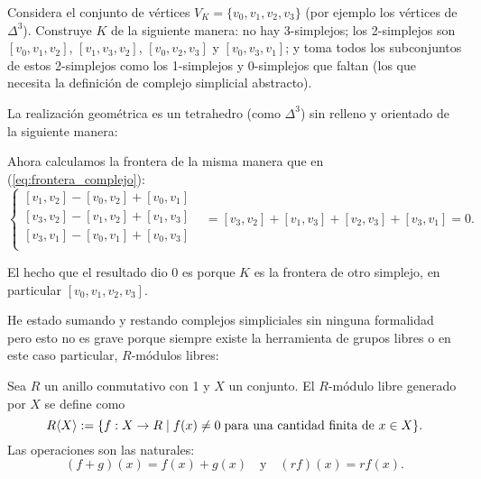 \documentclass[../../topologia_algebraica]{subfiles}
\begin{document}
\begin{ejemplo}
  Considera el conjunto de v\'ertices $V_K=\{v_0,v_1,v_2,v_3\}$ (por ejemplo los v\'ertices de $\Delta^3$).
  Construye $K$ de la siguiente manera: no hay 3-simplejos; los 2-simplejos son $[v_0,v_1,v_2]$, $[v_1,v_3,v_2]$,
  $[v_0,v_2,v_3]$ y $[v_0,v_3,v_1]$; y toma todos los subconjuntos de estos 2-simplejos como los
  1-simplejos y 0-simplejos que faltan (los que necesita la definici\'on de complejo simplicial abstracto).

  La realizaci\'on geom\'etrica es un tetrahedro (como $\Delta^3$) sin relleno y orientado de la siguiente
  manera:

\begin{figure}[h!]%
  \centering
\end{figure}%

  Ahora calculamos la frontera de la misma manera que en (\ref{eq:frontera_complejo}):
  \[
    \begin{cases}
      [v_1,v_2]-[v_0,v_2]+[v_0,v_1] & \\
      [v_3,v_2]-[v_1,v_2]+[v_1,v_3] & \\
      [v_3,v_1]-[v_0,v_1]+[v_0,v_3] & \\
    \end{cases}=[v_3,v_2]+[v_1,v_3]+[v_2,v_3]+[v_3,v_1]=0.
  \]

  El hecho que el resultado dio 0 es porque $K$ es la frontera de otro simplejo, en particular $[v_0,v_1,v_2,v_3]$.
\end{ejemplo}

He estado sumando y restando complejos simpliciales sin ninguna formalidad pero esto no es grave
porque siempre existe la herramienta de grupos libres o en este caso particular, $R$-m\'odulos
libres:

\begin{defin}
  Sea $R$ un anillo conmutativo con 1 y $X$ un conjunto. El $R$-m\'odulo libre generado por $X$ se
  define como
  \[
    R\langle X \rangle:=\{f:X\rightarrow R\mid f(x)\neq 0\;\text{para una cantidad finita de $x\in X$}\}.
  \]
  Las operaciones son las naturales:
  \[
    (f+g)(x)=f(x)+g(x) \quad\text{y}\quad (rf)(x)=rf(x).
  \]
\end{defin}
\end{document}
